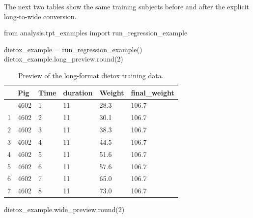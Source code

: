 \documentclass[
  letterpaper,
  DIV=11,
  numbers=noendperiod]{scrartcl}
\newenvironment{Shaded}{\begin{snugshade}}{\end{snugshade}}
\newcommand{\BuiltInTok}[1]{\textcolor[rgb]{0.00,0.23,0.31}{#1}}
\newcommand{\DecValTok}[1]{\textcolor[rgb]{0.68,0.00,0.00}{#1}}
\newcommand{\ImportTok}[1]{\textcolor[rgb]{0.00,0.46,0.62}{#1}}
\newcommand{\NormalTok}[1]{\textcolor[rgb]{0.00,0.23,0.31}{#1}}
\newcommand{\OperatorTok}[1]{\textcolor[rgb]{0.37,0.37,0.37}{#1}}
\begin{document}
The next two tables show the same training subjects before and after the
explicit long-to-wide conversion.

\begin{Shaded}
\begin{Highlighting}[]
\ImportTok{from}\NormalTok{ analysis.tpt\_examples }\ImportTok{import}\NormalTok{ run\_regression\_example}

\NormalTok{dietox\_example }\OperatorTok{=}\NormalTok{ run\_regression\_example()}
\NormalTok{dietox\_example.long\_preview.}\BuiltInTok{round}\NormalTok{(}\DecValTok{2}\NormalTok{)}
\end{Highlighting}
\end{Shaded}

\begin{longtable}[]{@{}llllll@{}}

\caption{\label{tbl-dietox-long-preview}Preview of the long-format
dietox training data.}

\tabularnewline

\toprule\noalign{}
& Pig & Time & duration & Weight & final\_weight \\
\midrule\noalign{}
\endhead
\bottomrule\noalign{}
\endlastfoot
0 & 4602 & 1 & 11 & 28.3 & 106.7 \\
1 & 4602 & 2 & 11 & 30.1 & 106.7 \\
2 & 4602 & 3 & 11 & 38.3 & 106.7 \\
3 & 4602 & 4 & 11 & 44.5 & 106.7 \\
4 & 4602 & 5 & 11 & 51.6 & 106.7 \\
5 & 4602 & 6 & 11 & 57.6 & 106.7 \\
6 & 4602 & 7 & 11 & 65.0 & 106.7 \\
7 & 4602 & 8 & 11 & 73.0 & 106.7 \\

\end{longtable}

\begin{Shaded}
\begin{Highlighting}[]
\NormalTok{dietox\_example.wide\_preview.}\BuiltInTok{round}\NormalTok{(}\DecValTok{2}\NormalTok{)}
\end{Highlighting}
\end{Shaded}
\end{document}
